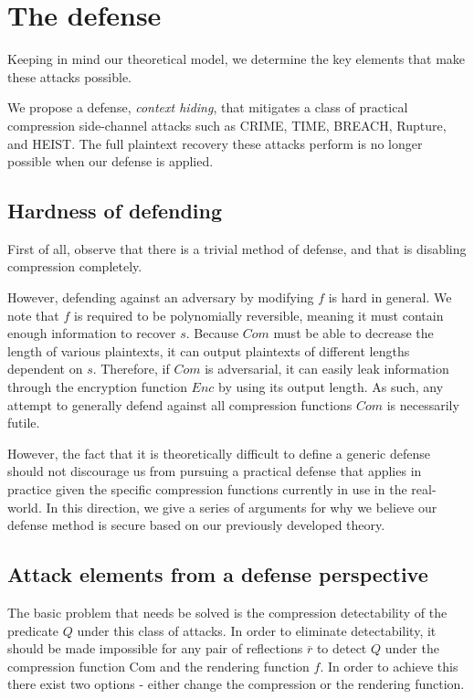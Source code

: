 \section{The defense}\label{sec:defense}
Keeping in mind our theoretical model, we determine the key elements that make these
attacks possible.

We propose a defense, \textit{context hiding}, that mitigates a class of
practical compression side-channel attacks such as CRIME, TIME, BREACH, Rupture,
and HEIST. The full plaintext recovery these attacks perform is no longer
possible when our defense is applied.

\subsection{Hardness of defending}
First of all, observe that there is a trivial method of defense, and that is
disabling compression completely.

However, defending against an adversary by modifying $f$ is hard in general. We
note that $f$ is required to be polynomially reversible, meaning it must contain
enough information to recover $s$. Because $Com$ must be able to decrease the
length of various plaintexts, it can output plaintexts of different lengths
dependent on $s$. Therefore, if $Com$ is adversarial, it can easily leak
information through the encryption function $Enc$ by using its output length. As
such, any attempt to generally defend against all compression functions $Com$ is
necessarily futile.

However, the fact that it is theoretically difficult to define a generic defense
should not discourage us from pursuing a practical defense that applies in
practice given the specific compression functions currently in use in the
real-world.  In this direction, we give a series of arguments for why we believe
our defense method is secure based on our previously developed theory.

\subsection{Attack elements from a defense perspective}
The basic problem that needs be solved is the compression detectability of the
predicate $Q$ under this class of attacks. In order to eliminate detectability,
it should be made impossible for any pair of reflections $\overbar{r}$ to detect
$Q$ under the compression function $\textrm{Com}$ and the rendering function
$f$. In order to achieve this there exist two options - either change the
compression or the rendering function.

